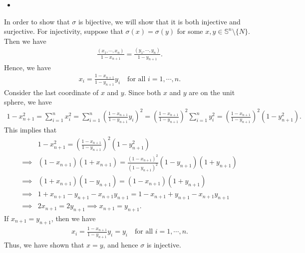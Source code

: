 \begin{itemize}
    \item [(b)] 
\end{itemize}
In order to show that $\sigma$ is bijective, we will show that it is both injective and surjective. For injectivity, suppose that $\sigma(x)=\sigma(y)$ for some $x,y\in \mathbb{S}^n\setminus \{N\}$. Then we have 
\begin{align}
    \frac{(x_1,\cdots,x_n)}{1-x_{n+1}}=\frac{(y_1,\cdots,y_n)}{1-y_{n+1}}.
\end{align}
Hence, we have 
\begin{align}
    x_i= \frac{1-x_{n+1}}{1-y_{n+1}}y_i\quad \text{for all } i=1,\cdots,n.
\end{align}
Consider the last coordinate of $x$ and $y$. Since both $x$ and $y$ are on the unit sphere, we have 
\begin{align}
    1-x_{n+1}^2=\sum_{i=1}^{n}x_i^2=\sum_{i=1}^{n}\left(\frac{1-x_{n+1}}{1-y_{n+1}}y_i\right)^2=\left(\frac{1-x_{n+1}}{1-y_{n+1}}\right)^2\sum_{i=1}^{n}y_i^2=\left(\frac{1-x_{n+1}}{1-y_{n+1}}\right)^2(1-y_{n+1}^2).
\end{align}
This implies that
\begin{align}
    &1-x_{n+1}^2=\left(\frac{1-x_{n+1}}{1-y_{n+1}}\right)^2(1-y_{n+1}^2)\\
    \implies &(1-x_{n+1})(1+x_{n+1})=\frac{(1-x_{n+1})^2}{(1-y_{n+1})^2}(1-y_{n+1})(1+y_{n+1})\\
    \implies &(1+x_{n+1})(1-y_{n+1})=(1-x_{n+1})(1+y_{n+1})\\
    \implies &1+x_{n+1}-y_{n+1}-x_{n+1}y_{n+1}=1-x_{n+1}+y_{n+1}-x_{n+1}y_{n+1}\\
    \implies &2x_{n+1}=2y_{n+1}\implies x_{n+1}=y_{n+1}.
\end{align}
If $x_{n+1}=y_{n+1}$, then we have
\begin{align}
    x_i= \frac{1-x_{n+1}}{1-y_{n+1}}y_i=y_i\quad \text{for all } i=1,\cdots,n.
\end{align}
Thus, we have shown that $x=y$, and hence $\sigma$ is injective.

